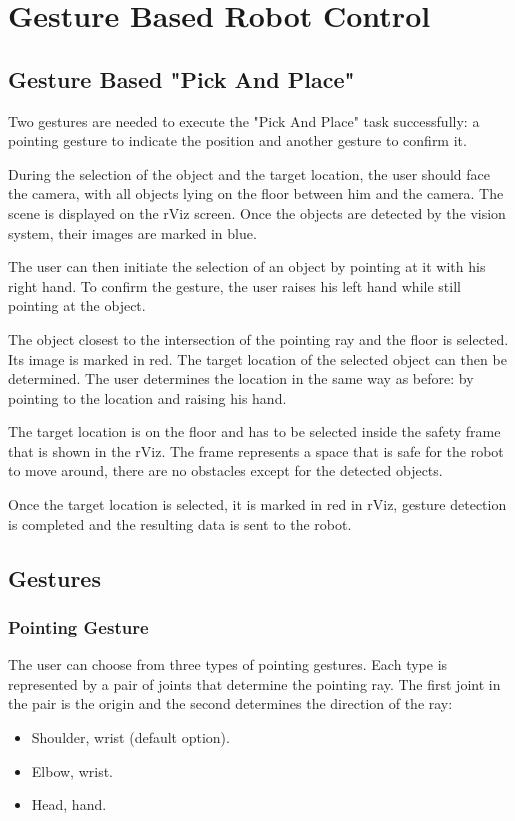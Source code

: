 \chapter{Gesture Based Robot Control}

\section{Gesture Based "Pick And Place"}
Two gestures are needed to execute the "Pick And Place" task successfully: a pointing gesture to indicate the position and another gesture to confirm it.\par
During the selection of the object and the target location, the user should face the camera, with all objects lying on the floor between him and the camera. The scene is displayed on the rViz screen. Once the objects are detected by the vision system, their images are marked in blue.\par
The user can then initiate the selection of an object by pointing at it with his right hand. To confirm the gesture, the user raises his left hand while still pointing at the object.\par
The object closest to the intersection of the pointing ray and the floor is selected. Its image is marked in red.
The target location of the selected object can then be determined. The user determines the location in the same way as before: by pointing to the location and raising his hand.\par
The target location is on the floor and  has to be selected inside the safety frame that is shown in the rViz. The frame represents a space that is safe for the robot to move around, there are no obstacles except for the detected objects.\par
Once the target location is selected, it is marked in red in rViz, gesture detection is completed and the resulting data is sent to the robot.\par

\section{Gestures}

\subsection{Pointing Gesture}
The user can choose from three types of pointing gestures. Each type is represented by a pair of joints that determine the pointing ray. The first joint in the pair is the origin and the second determines the direction of the ray:\par
\begin{itemize}
	\item Shoulder, wrist (default option).
    \item Elbow, wrist.
    \item Head, hand.
\end{itemize}

